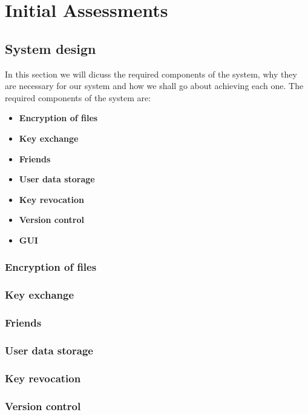 \documentclass[12pt, titlepage]{article}
\begin{document}
\section{Initial Assessments}

\subsection{System design}
In this section we will dicuss the required components of the system, why they are necessary for our system and how we shall go about achieving each one. The required components of the system are:
\begin{itemize}
	\item \textbf{Encryption of files}
	\item \textbf{Key exchange}
	\item \textbf{Friends}
	\item \textbf{User data storage}
	\item \textbf{Key revocation}
	\item \textbf{Version control}
	\item \textbf{GUI}
\end{itemize}

\subsubsection*{Encryption of files}

\subsubsection*{Key exchange}

\subsubsection*{Friends}

\subsubsection*{User data storage}

\subsubsection*{Key revocation}

\subsubsection*{Version control}
\end{document}
